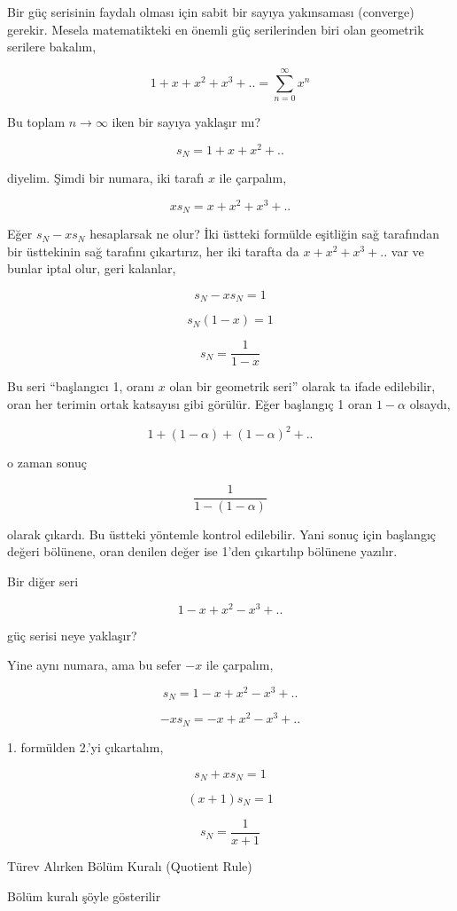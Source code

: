 \documentclass[12pt,fleqn]{article}\usepackage{../../common}
\begin{document}
Bir güç serisinin faydalı olması için sabit bir sayıya yakınsaması
(converge) gerekir. Mesela matematikteki en önemli güç serilerinden biri
olan geometrik serilere bakalım, 

$$ 1 + x + x^2 + x^3 + .. = \sum_{n=0}^{\infty} x^n  $$

Bu toplam $n \to \infty$ iken bir sayıya yaklaşır mı? 

$$ s_N = 1 + x + x^2 + ..  $$

diyelim. Şimdi bir numara, iki tarafı $x$ ile çarpalım, 

$$ x s_N = x + x^2 + x^3 + ..  $$

Eğer $s_N - xs_N$ hesaplarsak ne olur? İki üstteki formülde eşitliğin sağ
tarafından bir üsttekinin sağ tarafını çıkartırız, her iki tarafta da $x +
x^2 + x^3 + ..$ var ve bunlar iptal olur, geri kalanlar, 

$$ s_N - xs_N = 1  $$

$$ s_N(1-x) = 1 $$

$$ s_N = \frac{1}{1-x} $$

Bu seri ``başlangıcı 1, oranı $x$ olan bir geometrik seri'' olarak ta ifade
edilebilir, oran her terimin ortak katsayısı gibi görülür. Eğer başlangıç 1
oran $1-\alpha$ olsaydı,

$$ 1 + (1-\alpha) + (1-\alpha)^2 + .. $$

o zaman sonuç

$$ \frac{1}{1 - (1-\alpha)} $$

olarak çıkardı. Bu üstteki yöntemle kontrol edilebilir. Yani sonuç için
başlangıç değeri bölünene, oran denilen değer ise 1'den çıkartılıp
bölünene yazılır.

Bir diğer seri

$$ 1 - x + x^2 - x^3 + .. $$

güç serisi neye yaklaşır? 

Yine aynı numara, ama bu sefer $-x$ ile çarpalım,

$$ s_N  = 1 - x + x^2 - x^3 + .. $$

$$ -x s_N = -x + x^2 - x^3 + .. $$

1. formülden 2.'yi çıkartalım, 

$$ s_N + x s_N = 1$$

$$ (x+1)s_N  = 1$$

$$ s_N  = \frac{1}{x+1} $$

\newpage

Türev Alırken Bölüm Kuralı (Quotient Rule)

Bölüm kuralı şöyle gösterilir 
\end{document}
